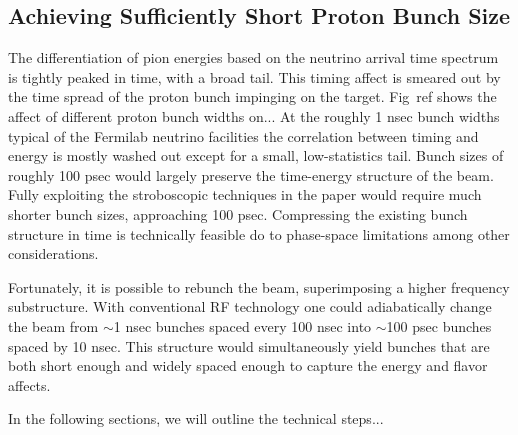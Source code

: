 \subsection{Achieving Sufficiently Short Proton Bunch Size}
\label{protonbunchsize}

The differentiation of pion energies based on the neutrino arrival time spectrum is tightly peaked in time, with a broad tail. This timing affect is smeared out by the time spread of the proton bunch impinging on the target. Fig~ref{} shows the affect of different proton bunch widths on... At the roughly 1 nsec bunch widths typical of the Fermilab neutrino facilities the correlation between timing and energy is mostly washed out except for a small, low-statistics tail. Bunch sizes of roughly 100 psec would largely preserve the time-energy structure of the beam. Fully exploiting the stroboscopic techniques in the paper would require much shorter bunch sizes, approaching 100 psec. Compressing the existing bunch structure in time is technically feasible do to phase-space limitations among other considerations.

Fortunately, it is possible to rebunch the beam, superimposing a higher frequency substructure. With conventional RF technology one could adiabatically change the beam from $\sim$1 nsec bunches spaced every 100 nsec into $\sim$100 psec bunches spaced by 10 nsec. This structure would simultaneously yield bunches that are both short enough and widely spaced enough to capture the energy and flavor affects. 

In the following sections, we will outline the technical steps...

 


